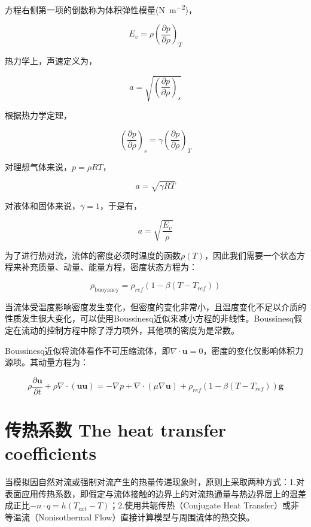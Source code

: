 方程右侧第一项的倒数称为体积弹性模量(\si{\newton\per\meter\squared})，

\[E_v = \rho\left(\frac{\partial p}{\partial \rho}\right)_T\]

热力学上，声速定义为，

\[a=\sqrt{\left(\frac{\partial p}{\partial \rho}\right)_s}\]

根据热力学定理，

\[\left(\frac{\partial p}{\partial \rho}\right)_s = \gamma \left(\frac{\partial p}{\partial \rho}\right)_T\]

对理想气体来说，$ p=\rho RT $，

\begin{equation}
a = \sqrt{\gamma RT}
\end{equation}

对液体和固体来说，$ \gamma = 1 $，于是有，

\begin{equation}
a=\sqrt{\frac{E_v}{\rho}}
\end{equation}



为了进行热对流，流体的密度必须时温度的函数$ \rho(T) $，因此我们需要一个状态方程来补充质量、动量、能量方程，密度状态方程为：

\begin{equation}
\rho_{\text{buoyancy}} = \rho_{ref}(1-\beta(T-T_{ref}))
\end{equation}

当流体受温度影响密度发生变化，但密度的变化非常小，且温度变化不足以介质的性质发生很大变化，可以使用Boussinesq近似来减小方程的非线性。Boussinesq假定在流动的控制方程中除了浮力项外，其他项的密度为是常数。

Boussinesq近似将流体看作不可压缩流体，即$ \nabla\cdot\bm{u} = 0 $，密度的变化仅影响体积力源项。其动量方程为：

\begin{equation}
\rho \frac{\partial \bm{u}}{\partial t} + \rho\nabla\cdot(\bm{uu}) = -\nabla p + \nabla\cdot(\mu\nabla\bm{u}) + \rho_{ref}(1-\beta(T-T_{ref}))\bm{g}
\end{equation}

\section{传热系数 The heat transfer coefficients}

当模拟因自然对流或强制对流产生的热量传递现象时，原则上采取两种方式：1.对表面应用传热系数，即假定与流体接触的边界上的对流热通量与热边界层上的温差成正比$-n\cdot q = h(T_{ext}-T)$；2.使用共轭传热（Conjugate Heat Transfer）或非等温流（Nonisothermal
Flow）直接计算模型与周围流体的热交换。

